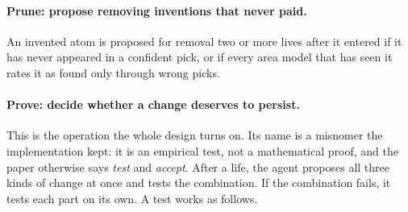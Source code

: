 \documentclass[11pt]{article}
\begin{document}
\paragraph{Prune: propose removing inventions that never paid.} An invented atom is proposed for removal two or more lives after it entered if it has never appeared in a confident pick, or if every area model that has seen it rates it as found only through wrong picks.

\paragraph{Prove: decide whether a change deserves to persist.} This is the operation the whole design turns on. Its name is a misnomer the implementation kept: it is an empirical test, not a mathematical proof, and the paper otherwise says \emph{test} and \emph{accept}. After a life, the agent proposes all three kinds of change at once and tests the combination. If the combination fails, it tests each part on its own. A test works as follows.
\end{document}
